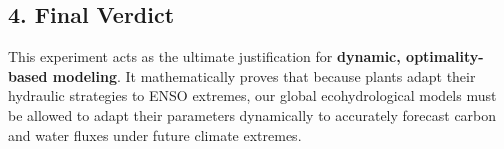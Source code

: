 \subsection*{4. Final Verdict}
This experiment acts as the ultimate justification for \textbf{dynamic, optimality-based modeling}. It mathematically proves that because plants adapt their hydraulic strategies to ENSO extremes, our global ecohydrological models must be allowed to adapt their parameters dynamically to accurately forecast carbon and water fluxes under future climate extremes.
